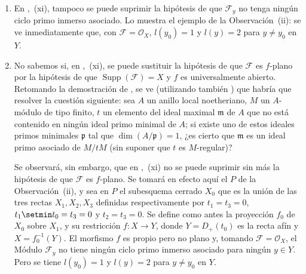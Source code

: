 \begin{remarks}[12.2.3]
\begin{enumerate}[label=(\roman*)]
  \item En ,~(xi), tampoco se puede suprimir la hipótesis de que $\mathcal F_y$ no tenga ningún ciclo primo inmerso asociado.
Lo muestra el ejemplo de la Observación~(ii): se ve inmediatamente que, con $\mathcal F=\mathcal O_X$, $l(y_0)=1$ y $l(y)=2$ para $y\neq y_0$ en $Y$.

  \item No sabemos si, en ,~(xi), se puede sustituir la hipótesis de que $\mathcal F$ es $f$-plano por la hipótesis de que $\operatorname{Supp}(\mathcal F)=X$ y $f$ es universalmente abierto.
Retomando la demostración de , se ve (utilizando también ) que habría que resolver la cuestión siguiente: sea $A$ un anillo local noetheriano, $M$ un $A$-módulo de tipo finito,
$t$ un elemento del ideal maximal $\mathfrak m$ de $A$ que no está contenido en ningún ideal primo minimal de $A$; si existe uno de estos ideales primos minimales $\mathfrak p$ tal que $\dim(A/\mathfrak p)=1$, ¿es cierto que $\mathfrak m$ es un ideal primo asociado de $M/tM$ (sin suponer que $t$ es $M$-regular)?

Se observará, sin embargo, que en ,~(xi) no se puede suprimir sin más la hipótesis de que $\mathcal F$ es $f$-plano. Se tomará en efecto aquí el $P$ de la Observación~(ii), y sea en $P$ el subesquema cerrado $X_0$ que es la unión de las tres rectas $X_1,X_2,X_3$ definidas respectivamente por $t_1=t_3=0$, $t_1\setmin t_0=t_3=0$ y $t_2=t_3=0$. Se define como antes la proyección $f_0$ de $X_0$ sobre $X_1$, y su restricción $f:X\to Y$, donde $Y=D_+(t_0)$ es la recta afín y $X=f_0^{-1}(Y)$. El morfismo $f$ es propio pero no plano y, tomando $\mathcal F=\mathcal O_X$, el Módulo $\mathcal F_y$ no tiene ningún ciclo primo inmerso asociado para ningún $y\in Y$. Pero se tiene $l(y_0)=1$ y $l(y)=2$ para $y\neq y_0$ en $Y$.
\end{enumerate}
\end{remarks}


